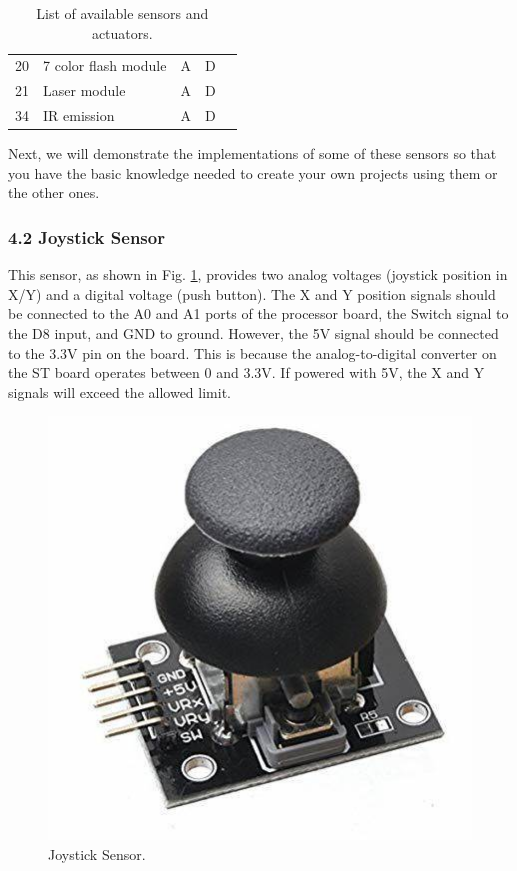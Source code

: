 \documentclass[10pt,a4paper,onecolumn]{article}
\begin{document}
\begin{table}[h!]
\begin{tabular}{clccc}
      \rowcolor{gray!20} 20  & 7 color flash module          & A                 & D              &                 \\
      21  & Laser module                  & A                 & D              &                 \\
      \rowcolor{gray!20} 34  & IR emission                   & A                 & D              &                 \\
      \hline
  \end{tabular}
  \caption{List of available sensors and actuators.}
  \label{table:sensors-actuators}
\end{table}

Next, we will demonstrate the implementations of some of these sensors so that you have the basic knowledge needed to create your own projects using them or the other ones.

\hypertarget{joystick-sensor}{%
\subsubsection{4.2 Joystick Sensor}\label{joystick-sensor}}

This sensor, as shown in Fig. \ref{fig:joystick}, provides two analog voltages (joystick position in X/Y) and a digital voltage (push button). The X and Y position signals should be connected to the A0 and A1 ports of the processor board, the Switch signal to the D8 input, and GND to ground. However, the 5V signal should be connected to the 3.3V pin on the board. This is because the analog-to-digital converter on the ST board operates between 0 and 3.3V. If powered with 5V, the X and Y signals will exceed the allowed limit.

\begin{figure}[H]
  \begin{center}
    \includegraphics[width=\dimexpr\textwidth-1cm\relax,height=\dimexpr0.25\textheight-3cm\relax,keepaspectratio]{images/joystick.jpg}
    \caption{Joystick Sensor.}
    \label{fig:joystick}
  \end{center}
\end{figure}
\end{document}
